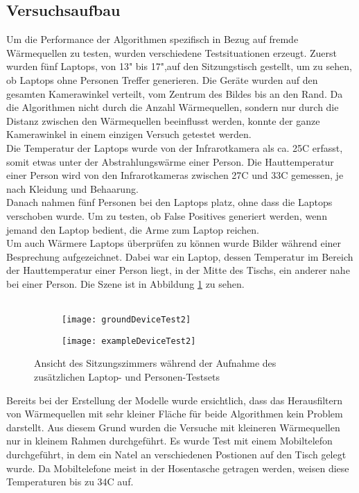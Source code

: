 \subsection{Versuchsaufbau}

Um die Performance der Algorithmen spezifisch in Bezug auf fremde Wärmequellen zu testen, wurden verschiedene Testsituationen erzeugt. Zuerst wurden fünf Laptops, von 13" bis 17",auf den Sitzungstisch gestellt, um zu sehen, ob Laptops ohne Personen Treffer generieren. Die Geräte wurden auf den gesamten Kamerawinkel verteilt, vom Zentrum des Bildes bis an den Rand. Da die Algorithmen nicht durch die Anzahl Wärmequellen, sondern nur durch die Distanz zwischen den Wärmequellen beeinflusst werden, konnte der ganze Kamerawinkel in einem einzigen Versuch getestet werden.\\
Die Temperatur der Laptops wurde von der Infrarotkamera als ca. 25\degree C erfasst, somit etwas unter der Abstrahlungswärme einer Person. Die Hauttemperatur einer Person wird von den Infrarotkameras zwischen 27\degree C und 33\degree C gemessen, je nach Kleidung und Behaarung.\\
Danach nahmen fünf Personen bei den Laptops platz,  ohne dass die Laptops verschoben wurde. Um zu testen, ob False Positives generiert werden, wenn jemand den Laptop bedient, die Arme zum Laptop reichen.\\
Um auch Wärmere Laptops überprüfen zu können wurde Bilder während einer Besprechung aufgezeichnet. Dabei war ein Laptop, dessen Temperatur im Bereich der Hauttemperatur einer Person liegt, in der Mitte des Tischs, ein anderer nahe bei einer Person. Die Szene ist in Abbildung \ref{fig:exampleDeviceTest2} zu sehen.\\
\\
\begin{figure}[htb]
	\centering
	\begin{subfigure}{.45\linewidth}
		\centering
		\texttt{[image: groundDeviceTest2]}
	\end{subfigure}
	\begin{subfigure}{.45\linewidth}
		\centering
		\texttt{[image: exampleDeviceTest2]}
	\end{subfigure}
	\caption{Ansicht des Sitzungszimmers während der Aufnahme des zusätzlichen Laptop- und Personen-Testsets}
	\label{fig:exampleDeviceTest2}
\end{figure}

\noindent
Bereits bei der Erstellung der Modelle wurde ersichtlich, dass das Herausfiltern von Wärmequellen mit sehr kleiner Fläche für beide Algorithmen kein Problem darstellt. Aus diesem Grund wurden die Versuche mit kleineren Wärmequellen nur in kleinem Rahmen durchgeführt. Es wurde Test mit einem Mobiltelefon durchgeführt, in dem ein Natel an verschiedenen Postionen auf den Tisch gelegt wurde. Da Mobiltelefone meist in der Hosentasche getragen werden, weisen diese Temperaturen bis zu 34\degree C auf.\\
\\

